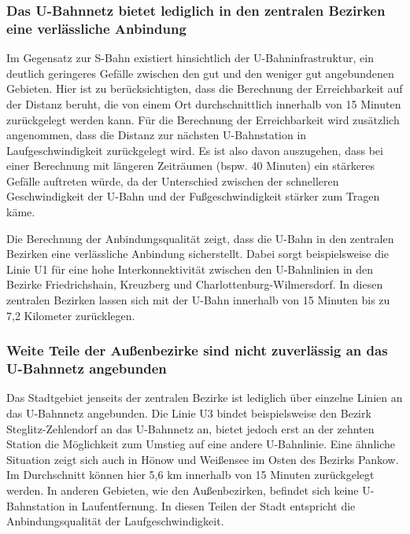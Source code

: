 \subsubsection{Das U-Bahnnetz bietet lediglich in den zentralen Bezirken eine verlässliche Anbindung}
Im Gegensatz zur S-Bahn existiert hinsichtlich der U-Bahninfrastruktur, ein deutlich geringeres Gefälle zwischen den gut und den weniger gut angebundenen Gebieten. Hier ist zu berücksichtigten, dass die Berechnung der Erreichbarkeit auf der Distanz beruht, die von einem Ort durchschnittlich innerhalb von 15 Minuten zurückgelegt werden kann. Für die Berechnung der Erreichbarkeit wird zusätzlich angenommen, dass die Distanz zur nächsten U-Bahnstation in Laufgeschwindigkeit zurückgelegt wird. Es ist also davon auszugehen, dass bei einer Berechnung mit längeren Zeiträumen (bspw. 40 Minuten) ein stärkeres Gefälle auftreten würde, da der Unterschied zwischen der schnelleren Geschwindigkeit der U-Bahn und der Fußgeschwindigkeit stärker zum Tragen käme.

Die Berechnung der Anbindungsqualität zeigt, dass die U-Bahn in den zentralen Bezirken eine verlässliche Anbindung sicherstellt. Dabei sorgt beispielsweise die Linie U1 für eine hohe Interkonnektivität zwischen den U-Bahnlinien in den Bezirke Friedrichshain, Kreuzberg und Charlottenburg-Wilmersdorf. In diesen zentralen Bezirken lassen sich mit der U-Bahn innerhalb von 15 Minuten bis zu 7,2 Kilometer zurücklegen.












\subsubsection{Weite Teile der Außenbezirke sind nicht zuverlässig an das U-Bahnnetz angebunden}
Das Stadtgebiet jenseits der zentralen Bezirke ist lediglich über einzelne Linien an das U-Bahnnetz angebunden. Die Linie U3 bindet beispielsweise den Bezirk Steglitz-Zehlendorf an das U-Bahnnetz an, bietet jedoch erst an der zehnten Station die Möglichkeit zum Umstieg auf eine andere U-Bahnlinie. Eine ähnliche Situation zeigt sich auch in Hönow und Weißensee im Osten des Bezirks Pankow. Im Durchschnitt können hier 5,6 km innerhalb von 15 Minuten zurückgelegt werden. In anderen Gebieten, wie den Außenbezirken, befindet sich keine U-Bahnstation in Laufentfernung. In diesen Teilen der Stadt entspricht die Anbindungsqualität der Laufgeschwindigkeit.










